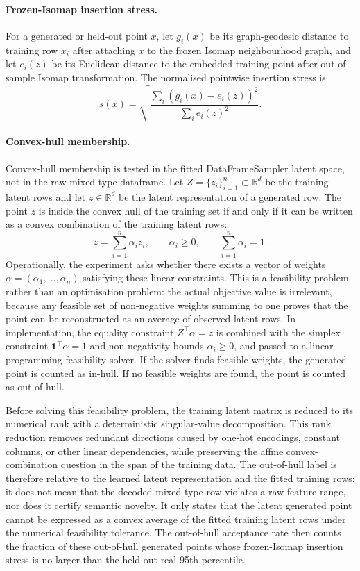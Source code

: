 \paragraph{Frozen-Isomap insertion stress.}
For a generated or held-out point $x$, let $g_i(x)$ be its graph-geodesic
distance to training row $x_i$ after attaching $x$ to the frozen Isomap
neighbourhood graph, and let $e_i(z)$ be its Euclidean distance to the embedded
training point after out-of-sample Isomap transformation. The normalised
pointwise insertion stress is
\[
  s(x)
  =
  \sqrt{
  \frac{\sum_i (g_i(x)-e_i(z))^2}
       {\sum_i e_i(z)^2}
  }.
\]

\paragraph{\textbf{Convex-hull membership.}}
Convex-hull membership is tested in the fitted DataFrameSampler latent space,
not in the raw mixed-type dataframe. Let
$Z=\{z_i\}_{i=1}^n\subset\mathbb{R}^d$ be the training latent rows and let
$z\in\mathbb{R}^d$ be the latent representation of a generated row. The point
$z$ is inside the convex hull of the training set if and only if it can be
written as a convex combination of the training latent rows:
\[
  z = \sum_{i=1}^n \alpha_i z_i,
  \qquad
  \alpha_i\ge 0,
  \qquad
  \sum_{i=1}^n \alpha_i = 1.
\]
Operationally, the experiment asks whether there exists a vector of weights
$\alpha=(\alpha_1,\ldots,\alpha_n)$ satisfying these linear constraints. This
is a feasibility problem rather than an optimisation problem: the actual
objective value is irrelevant, because any feasible set of non-negative weights
summing to one proves that the point can be reconstructed as an average of
observed latent rows. In implementation, the equality constraint
$Z^\top\alpha=z$ is combined with the simplex constraint
$\mathbf{1}^\top\alpha=1$ and non-negativity bounds $\alpha_i\ge0$, and passed
to a linear-programming feasibility solver. If the solver finds feasible
weights, the generated point is counted as in-hull. If no feasible weights are
found, the point is counted as out-of-hull.

Before solving this feasibility problem, the training latent matrix is reduced
to its numerical rank with a deterministic singular-value decomposition. This
rank reduction removes redundant directions caused by one-hot encodings,
constant columns, or other linear dependencies, while preserving the affine
convex-combination question in the span of the training data. The out-of-hull
label is therefore relative to the learned latent representation and the fitted
training rows: it does not mean that the decoded mixed-type row violates a raw
feature range, nor does it certify semantic novelty. It only states that the
latent generated point cannot be expressed as a convex average of the fitted
training latent rows under the numerical feasibility tolerance. The out-of-hull
acceptance rate then counts the fraction of these out-of-hull generated points
whose frozen-Isomap insertion stress is no larger than the held-out real 95th
percentile.

